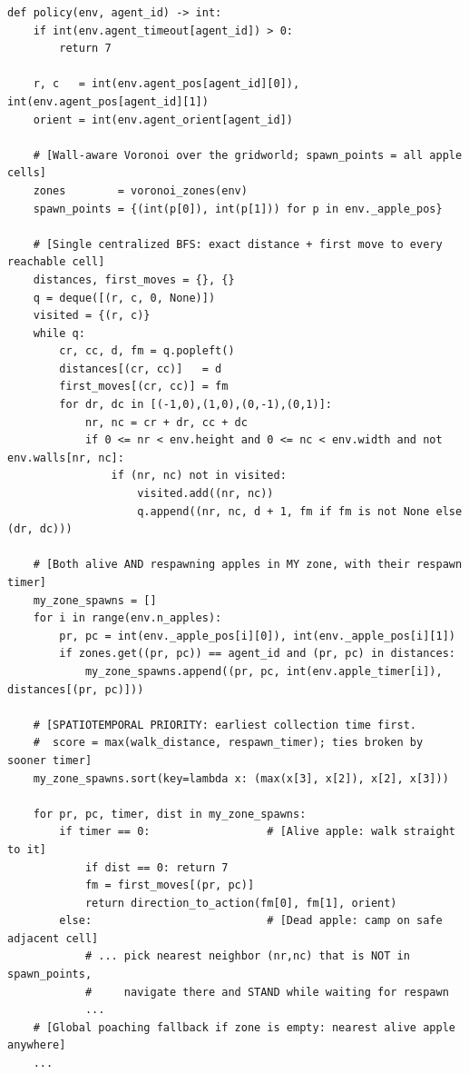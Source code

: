 \documentclass{article}
\begin{document}
\begin{lstlisting}[style=pythonpolicy, caption={Gathering -- Gemini 3.1 Pro. Voronoi territories + spatiotemporal priority targeting (verbatim, abridged).}, label={lst:gather-gemini}]
def policy(env, agent_id) -> int:
    if int(env.agent_timeout[agent_id]) > 0:
        return 7

    r, c   = int(env.agent_pos[agent_id][0]), int(env.agent_pos[agent_id][1])
    orient = int(env.agent_orient[agent_id])

    # [Wall-aware Voronoi over the gridworld; spawn_points = all apple cells]
    zones        = voronoi_zones(env)
    spawn_points = {(int(p[0]), int(p[1])) for p in env._apple_pos}

    # [Single centralized BFS: exact distance + first move to every reachable cell]
    distances, first_moves = {}, {}
    q = deque([(r, c, 0, None)])
    visited = {(r, c)}
    while q:
        cr, cc, d, fm = q.popleft()
        distances[(cr, cc)]   = d
        first_moves[(cr, cc)] = fm
        for dr, dc in [(-1,0),(1,0),(0,-1),(0,1)]:
            nr, nc = cr + dr, cc + dc
            if 0 <= nr < env.height and 0 <= nc < env.width and not env.walls[nr, nc]:
                if (nr, nc) not in visited:
                    visited.add((nr, nc))
                    q.append((nr, nc, d + 1, fm if fm is not None else (dr, dc)))

    # [Both alive AND respawning apples in MY zone, with their respawn timer]
    my_zone_spawns = []
    for i in range(env.n_apples):
        pr, pc = int(env._apple_pos[i][0]), int(env._apple_pos[i][1])
        if zones.get((pr, pc)) == agent_id and (pr, pc) in distances:
            my_zone_spawns.append((pr, pc, int(env.apple_timer[i]), distances[(pr, pc)]))

    # [SPATIOTEMPORAL PRIORITY: earliest collection time first.
    #  score = max(walk_distance, respawn_timer); ties broken by sooner timer]
    my_zone_spawns.sort(key=lambda x: (max(x[3], x[2]), x[2], x[3]))

    for pr, pc, timer, dist in my_zone_spawns:
        if timer == 0:                  # [Alive apple: walk straight to it]
            if dist == 0: return 7
            fm = first_moves[(pr, pc)]
            return direction_to_action(fm[0], fm[1], orient)
        else:                           # [Dead apple: camp on safe adjacent cell]
            # ... pick nearest neighbor (nr,nc) that is NOT in spawn_points,
            #     navigate there and STAND while waiting for respawn
            ...
    # [Global poaching fallback if zone is empty: nearest alive apple anywhere]
    ...
\end{lstlisting}
\end{document}
